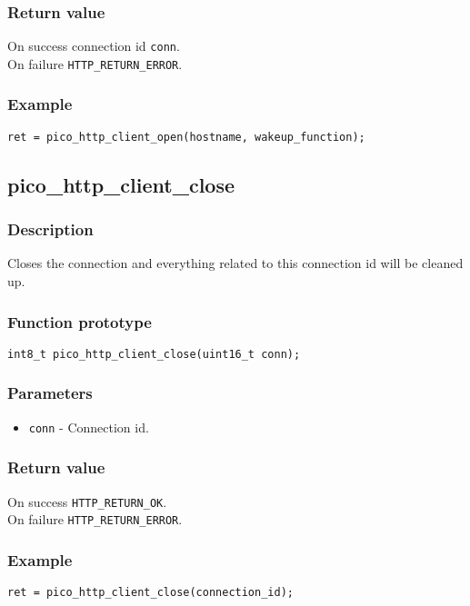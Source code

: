 \subsubsection*{Return value}
On success connection id \texttt{conn}.
\\On failure \texttt{HTTP\_RETURN\_ERROR}.

\subsubsection*{Example}
\begin{verbatim}
ret = pico_http_client_open(hostname, wakeup_function);
\end{verbatim}


\subsection{pico\_http\_client\_close}

\subsubsection*{Description}
Closes the connection and everything related to this connection id will be cleaned up.

\subsubsection*{Function prototype}
\texttt{int8\_t pico\_http\_client\_close(uint16\_t conn);}

\subsubsection*{Parameters}
\begin{itemize}[noitemsep]
\item \texttt{conn} - Connection id.
\end{itemize}
\subsubsection*{Return value}
On success \texttt{HTTP\_RETURN\_OK}.
\\On failure \texttt{HTTP\_RETURN\_ERROR}.
\subsubsection*{Example}
\begin{verbatim}
ret = pico_http_client_close(connection_id);
\end{verbatim}

